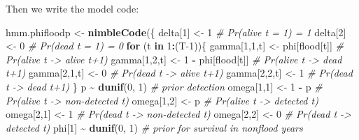 \documentclass[
  12pt,
]{krantz}
\newenvironment{Shaded}{\begin{snugshade}}{\end{snugshade}}
\newcommand{\CommentTok}[1]{\textcolor[rgb]{0.56,0.35,0.01}{\textit{#1}}}
\newcommand{\ControlFlowTok}[1]{\textcolor[rgb]{0.13,0.29,0.53}{\textbf{#1}}}
\newcommand{\DecValTok}[1]{\textcolor[rgb]{0.00,0.00,0.81}{#1}}
\newcommand{\FunctionTok}[1]{\textcolor[rgb]{0.13,0.29,0.53}{\textbf{#1}}}
\newcommand{\NormalTok}[1]{#1}
\newcommand{\OtherTok}[1]{\textcolor[rgb]{0.56,0.35,0.01}{#1}}
\newcommand{\SpecialCharTok}[1]{\textcolor[rgb]{0.81,0.36,0.00}{\textbf{#1}}}
\begin{document}
Then we write the model code:

\begin{Shaded}
\begin{Highlighting}[]
\NormalTok{hmm.phifloodp }\OtherTok{\textless{}{-}} \FunctionTok{nimbleCode}\NormalTok{(\{}
\NormalTok{  delta[}\DecValTok{1}\NormalTok{] }\OtherTok{\textless{}{-}} \DecValTok{1}          \CommentTok{\# Pr(alive t = 1) = 1}
\NormalTok{  delta[}\DecValTok{2}\NormalTok{] }\OtherTok{\textless{}{-}} \DecValTok{0}          \CommentTok{\# Pr(dead t = 1) = 0}
  \ControlFlowTok{for}\NormalTok{ (t }\ControlFlowTok{in} \DecValTok{1}\SpecialCharTok{:}\NormalTok{(T}\DecValTok{{-}1}\NormalTok{))\{}
\NormalTok{    gamma[}\DecValTok{1}\NormalTok{,}\DecValTok{1}\NormalTok{,t] }\OtherTok{\textless{}{-}}\NormalTok{ phi[flood[t]]      }\CommentTok{\# Pr(alive t {-}\textgreater{} alive t+1)}
\NormalTok{    gamma[}\DecValTok{1}\NormalTok{,}\DecValTok{2}\NormalTok{,t] }\OtherTok{\textless{}{-}} \DecValTok{1} \SpecialCharTok{{-}}\NormalTok{ phi[flood[t]]  }\CommentTok{\# Pr(alive t {-}\textgreater{} dead t+1)}
\NormalTok{    gamma[}\DecValTok{2}\NormalTok{,}\DecValTok{1}\NormalTok{,t] }\OtherTok{\textless{}{-}} \DecValTok{0}        \CommentTok{\# Pr(dead t {-}\textgreater{} alive t+1)}
\NormalTok{    gamma[}\DecValTok{2}\NormalTok{,}\DecValTok{2}\NormalTok{,t] }\OtherTok{\textless{}{-}} \DecValTok{1}        \CommentTok{\# Pr(dead t {-}\textgreater{} dead t+1)}
\NormalTok{  \}}
\NormalTok{  p }\SpecialCharTok{\textasciitilde{}} \FunctionTok{dunif}\NormalTok{(}\DecValTok{0}\NormalTok{, }\DecValTok{1}\NormalTok{) }\CommentTok{\# prior detection}
\NormalTok{  omega[}\DecValTok{1}\NormalTok{,}\DecValTok{1}\NormalTok{] }\OtherTok{\textless{}{-}} \DecValTok{1} \SpecialCharTok{{-}}\NormalTok{ p    }\CommentTok{\# Pr(alive t {-}\textgreater{} non{-}detected t)}
\NormalTok{  omega[}\DecValTok{1}\NormalTok{,}\DecValTok{2}\NormalTok{] }\OtherTok{\textless{}{-}}\NormalTok{ p        }\CommentTok{\# Pr(alive t {-}\textgreater{} detected t)}
\NormalTok{  omega[}\DecValTok{2}\NormalTok{,}\DecValTok{1}\NormalTok{] }\OtherTok{\textless{}{-}} \DecValTok{1}        \CommentTok{\# Pr(dead t {-}\textgreater{} non{-}detected t)}
\NormalTok{  omega[}\DecValTok{2}\NormalTok{,}\DecValTok{2}\NormalTok{] }\OtherTok{\textless{}{-}} \DecValTok{0}        \CommentTok{\# Pr(dead t {-}\textgreater{} detected t)}
\NormalTok{  phi[}\DecValTok{1}\NormalTok{] }\SpecialCharTok{\textasciitilde{}} \FunctionTok{dunif}\NormalTok{(}\DecValTok{0}\NormalTok{, }\DecValTok{1}\NormalTok{) }\CommentTok{\# prior for survival in nonflood years}

\end{Highlighting}
\end{Shaded}
\end{document}
